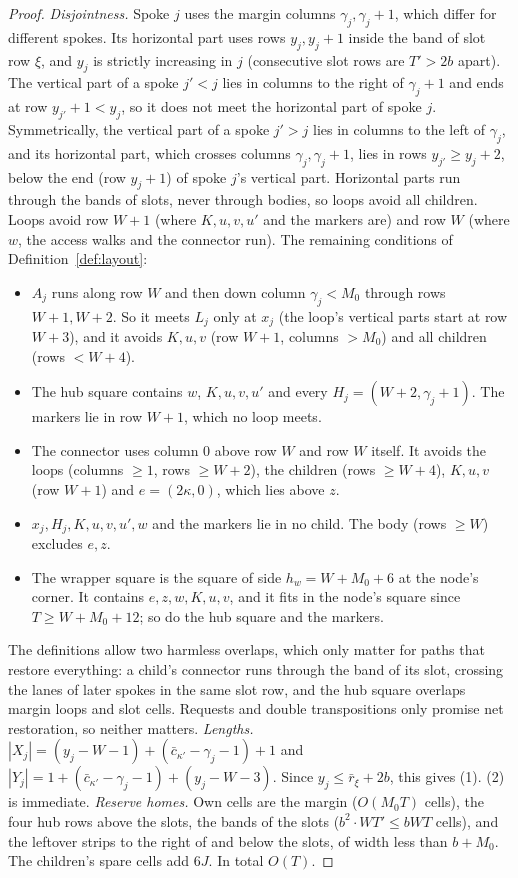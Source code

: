 \documentclass[11pt]{amsart}
\theoremstyle{definition}
\begin{document}
\begin{proof}
\emph{Disjointness.} Spoke $j$ uses the margin columns $\gamma_j,\gamma_j+1$, which differ for different spokes. Its
horizontal part uses rows $y_j,y_j+1$ inside the band of slot row $\xi$, and $y_j$ is strictly increasing in
$j$ (consecutive slot rows are $T'>2b$ apart). The vertical part of a spoke $j'<j$ lies in columns to the right of $\gamma_j+1$ and ends at row
$y_{j'}+1<y_j$, so it does not meet the horizontal part of spoke $j$. Symmetrically, the vertical part of a spoke $j'>j$ lies in columns to the left of $\gamma_j$, and its
horizontal part, which crosses columns $\gamma_j,\gamma_j+1$, lies in rows $y_{j'}\ge y_j+2$, below the end (row $y_j+1$) of spoke $j$'s
vertical part. Horizontal parts run through the bands of slots, never through bodies, so loops avoid all
children. Loops avoid row $W+1$ (where $K,u,v,u'$ and the markers are) and row $W$ (where $w$, the access walks and
the connector run). The remaining conditions of Definition~\ref{def:layout}:
\begin{itemize}[nosep]
\item $A_j$ runs along row $W$ and then down column $\gamma_j<M_0$ through rows $W+1,W+2$. So it meets $L_j$ only at $x_j$ (the
  loop's vertical parts start at row $W+3$), and it avoids $K,u,v$ (row $W+1$, columns $>M_0$) and all children (rows $<W+4$).
\item The hub square contains $w$, $K,u,v,u'$ and every $H_j=(W+2,\gamma_j+1)$. The markers lie in row $W+1$, which no loop meets.
\item The connector uses column $0$ above row $W$ and row $W$ itself. It avoids the loops (columns $\ge1$, rows $\ge W+2$), the
  children (rows $\ge W+4$), $K,u,v$ (row $W+1$) and $e=(2\kappa,0)$, which lies above $z$.
\item $x_j,H_j,K,u,v,u',w$ and the markers lie in no child. The body (rows $\ge W$) excludes $e,z$.
\item The wrapper square is the square of side $h_w=W+M_0+6$ at the node's corner. It contains $e,z,w,K,u,v$, and it fits in
  the node's square since $T\ge W+M_0+12$; so do the hub square and the markers.
\end{itemize}
The definitions allow two harmless overlaps, which only matter for paths that restore everything: a child's connector
runs through the band of its slot, crossing the lanes of later spokes in the same slot row, and the hub square overlaps margin
loops and slot cells. Requests and double transpositions only promise net restoration, so neither matters.
\emph{Lengths.} $|X_j|=(y_j-W-1)+(\bar c_{\kappa'}-\gamma_j-1)+1$ and $|Y_j|=1+(\bar c_{\kappa'}-\gamma_j-1)+(y_j-W-3)$. Since
$y_j\le \bar r_\xi+2b$, this gives (1). (2) is immediate.
\emph{Reserve homes.} Own cells are the margin ($O(M_0T)$ cells), the four hub rows above the slots, the bands
of the slots ($b^2\cdot WT'\le bWT$ cells), and the leftover strips to the right of and below the slots, of
width less than $b+M_0$. The children's spare cells add $6J$. In total $O(T)$.
\end{proof}
\end{document}
